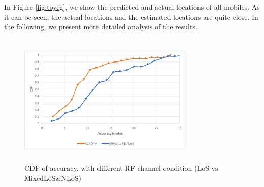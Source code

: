 \documentclass[conference, 10pt]{IEEEtran}
\begin{document}
In Figure \ref{fig:toyeg}, we show the predicted and actual locations of all mobiles. As it can be seen, the actual locations
and the estimated locations are quite close. In the following, we present more
detailed analysis of the results.

\begin{figure}[t]
\begin{center}
 \includegraphics[height=2.5in, width=3.3in]{./Accuracy_ChannelModel.png}
\caption{CDF of accuracy.\label{fig:leapperf} with different RF channel condition (LoS vs. MixedLoS\&NLoS)}
\end{center}
\end{figure}
\end{document}
